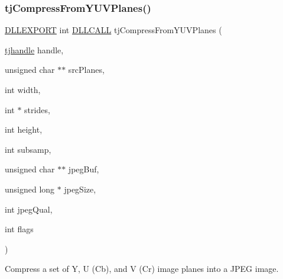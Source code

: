 \subsubsection{\texorpdfstring{tj\+Compress\+From\+Y\+U\+V\+Planes()}{tjCompressFromYUVPlanes()}}
{\footnotesize\ttfamily \hyperlink{turbojpeg_8h_a808e08638be3cba36e36759e5b150de0}{D\+L\+L\+E\+X\+P\+O\+RT} int \hyperlink{turbojpeg_8h_a54b25836118bfac94a53a7b790f3ccb2}{D\+L\+L\+C\+A\+LL} tj\+Compress\+From\+Y\+U\+V\+Planes (\begin{DoxyParamCaption}\item[{\hyperlink{group___turbo_j_p_e_g_ga758d2634ecb4949de7815cba621f5763}{tjhandle}}]{handle,  }\item[{unsigned char $\ast$$\ast$}]{src\+Planes,  }\item[{int}]{width,  }\item[{int $\ast$}]{strides,  }\item[{int}]{height,  }\item[{int}]{subsamp,  }\item[{unsigned char $\ast$$\ast$}]{jpeg\+Buf,  }\item[{unsigned long $\ast$}]{jpeg\+Size,  }\item[{int}]{jpeg\+Qual,  }\item[{int}]{flags }\end{DoxyParamCaption})}

Compress a set of Y, U (Cb), and V (Cr) image planes into a J\+P\+EG image.


